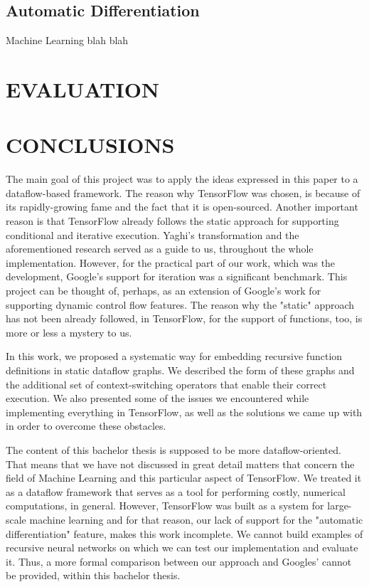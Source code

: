 \documentclass[ack,preface]{dithesis}
\begin{document}
    \section{Automatic Differentiation}

Machine Learning blah blah


\chapter{EVALUATION}

\chapter{CONCLUSIONS}

The main goal of this project was to apply the ideas expressed in this \cite{Rondogiannis:1997} paper to a dataflow-based framework. The reason why TensorFlow was chosen, is because of its rapidly-growing fame and the fact that it is open-sourced. Another important reason is that TensorFlow already follows the static approach for supporting conditional and iterative execution. Yaghi's transformation and the aforementioned research  served as a guide to us, throughout the whole implementation.  However, for the practical part of our work, which was the development,  Google's support for iteration was a significant benchmark. This project can be thought of, perhaps, as an extension of Google's work for supporting dynamic control flow features. The reason why the "static" approach has not been already followed, in TensorFlow, for the support of functions, too,  is more or less a mystery to us.

In this work,  we proposed a systematic way for embedding recursive function definitions in static dataflow graphs. We described the form of these graphs and the additional set of context-switching operators that enable their correct execution. We also presented some of the issues we encountered while implementing everything in TensorFlow, as well as the solutions we came up with in order to overcome these obstacles.

The content of this bachelor thesis is supposed to be more dataflow-oriented. That means that we have not discussed in great detail matters that concern the field of  Machine Learning and this particular aspect of TensorFlow. We treated it as a dataflow framework that serves as a tool for performing  costly, numerical computations, in general. However, TensorFlow was  built as a system for large-scale machine learning and for that reason, our lack of support for the "automatic differentiation" feature, makes this work incomplete. We cannot build examples of recursive neural networks on which we can test our implementation and evaluate it.  Thus, a more formal comparison between our approach and Googles' cannot be provided, within this bachelor thesis.
\end{document}
